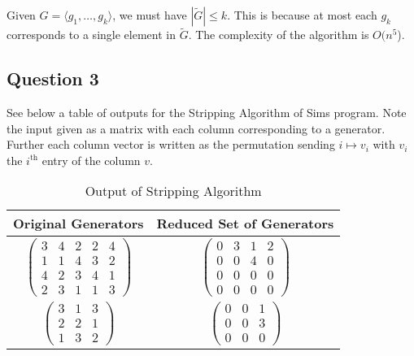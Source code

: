 \documentclass{article}
\begin{document}
Given $G=\langle g_1,\ldots ,g_k\rangle$,  we must have $|\tilde G|\le k$. This is because at most each $g_k$ corresponds to a single element in $\tilde G$.  The complexity of the algorithm is $O(n^5$).
\subsection{Question 3}
See below a table of outputs for the Stripping Algorithm of Sims program.  Note the input given as a matrix with each column corresponding to a generator.  Further each column vector is written as the permutation sending $i\mapsto v_i$ with $v_i$ the $i^\text{th}$ entry of the column $v$. 

\begin{table}[hp]
\begin{center}
\begin{tabular}{|c|c|}
\hline
Original Generators           & Reduced Set of Generators      \\ \hline
$\begin{pmatrix} 3 & 4 & 2& 2 & 4\\

     1   & 1  & 4 & 3 &2\\ 

     4  &   2    & 3   &  4  &   1\\

     2  &   3   &  1  &   1  &   3 \end{pmatrix}$ & $\begin{pmatrix}0 & 3  &  1   &  2\\

     0  &  0  &  4   &  0\\

     0  &   0  &   0   &  0\\

     0  &   0  &   0   &  0\end{pmatrix}$ \\
$\begin{pmatrix}3  &   1  &   3\\

     2   &  2  &   1\\

     1   &  3  &   2\end{pmatrix}$     & $\begin{pmatrix}0   & 0 &  1\\

     0 & 0     &   3\\

     0    & 0  & 0\end{pmatrix}$     \\ \hline
\end{tabular}
\caption{Output of Stripping Algorithm}
\end{center}
\end{table}
\end{document}
